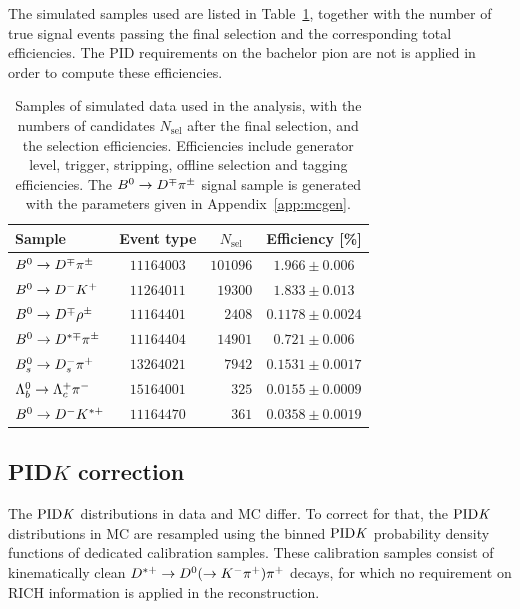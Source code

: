The simulated samples used are listed in Table~\ref{tab:MC_samples}, together with the
number of true signal events passing the final selection and the corresponding
total efficiencies. The PID requirements on the bachelor pion are not is applied in order to
compute these efficiencies.
\begin{table}[t]
	\centering
	\begin{tabular}{lcrc}
		\toprule
		Sample 				& Event type & \multicolumn{1}{c}{$N_\text{sel}$} & Efficiency [\%] \\
		\midrule
		$B^0\rightarrow D^\mp\pi^\pm$ 		& $11164003$ & $101096$ & $1.966\pm0.006$ 	\\
		$B^0\rightarrow D^-K^+$ 		& $11264011$ & $19300$ 	& $1.833\pm0.013$ 	\\
		$B^0\rightarrow D^\mp\rho^\pm$ 	& $11164401$ & $2408$ 	& $0.1178\pm0.0024$ 	\\
		$B^0\rightarrow D^{*\mp}\pi^\pm$ 	& $11164404$ & $14901$ 	& $0.721\pm0.006$ 	\\
		$B^0_s\rightarrow D^-_s\pi^+$ 	& $13264021$ & $7942$ 	& $0.1531\pm0.0017$ \\
		$\Lambda^0_b\rightarrow \Lambda_c^{+}\pi^-$ 	& $15164001$ & $325$ 	& $0.0155\pm0.0009$ \\
		$B^0\rightarrow D^- K^{*+}$ 	& $11164470$ & $361$ 	& $0.0358\pm0.0019$ 	\\
		\bottomrule
	\end{tabular}
	\caption{Samples of simulated data used in the analysis, with the numbers of candidates
	$N_\text{sel}$ after the final selection, and the selection efficiencies. Efficiencies
	include generator level, trigger, stripping, offline selection and tagging efficiencies.
        The $B^0\rightarrow D^\mp\pi^\pm$ signal sample is generated with the parameters given in Appendix~\ref{app:mcgen}.}
	\label{tab:MC_samples}
\end{table}

\subsection{PID$K$ correction}
\label{sec:pid}

The $\rm{PID}\it{K}$ distributions in data and MC differ. To correct for that,
the $\rm{PID}\it{K}$ distributions in MC are resampled using the binned $\rm{PID}\it{K}$
probability density functions of dedicated calibration samples. 
These calibration samples consist of kinematically clean $D^{*+}\rightarrow
D^0(\rightarrow K^-\pi^+)\pi^+$ decays, for which no requirement on RICH
information is applied in the reconstruction.

